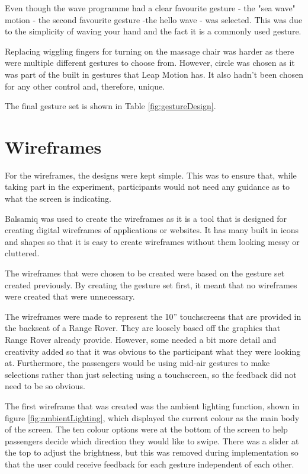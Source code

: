 \documentclass{l4proj}
\begin{document}
Even though the wave programme had a clear favourite gesture - the "sea wave" motion - the second favourite gesture -the hello wave - was selected. This was due to the simplicity of waving your hand and the fact it is a commonly used gesture.

Replacing wiggling fingers for turning on the massage chair was harder as there were multiple different gestures to choose from. However, circle was chosen as it was part of the built in gestures that Leap Motion has. It also hadn't been chosen for any other control and, therefore, unique.

The final gesture set is shown in Table \ref{fig:gestureDesign}.

\section{Wireframes}
For the wireframes, the designs were kept simple. This was to ensure that, while taking part in the experiment, participants would not need any guidance as to what the screen is indicating.

Balsamiq was used to create the wireframes as it is a tool that is designed for creating digital wireframes of applications or websites. It has many built in icons and shapes so that it is easy to create wireframes without them looking messy or cluttered.

The wireframes that were chosen to be created were based on the gesture set created previously. By creating the gesture set first, it meant that no wireframes were created that were unnecessary.

The wireframes were made to represent the 10” touchscreens that are provided in the backseat of a Range Rover. They are loosely based off the graphics that Range Rover already provide. However, some needed a bit more detail and creativity added so that it was obvious to the participant what they were looking at. Furthermore, the passengers would be using mid-air gestures to make selections rather than just selecting using a touchscreen, so the feedback did not need to be so obvious.

The first wireframe that was created was the ambient lighting function, shown in figure \ref{fig:ambientLighting}, which displayed the current colour as the main body of the screen. The ten colour options were at the bottom of the screen to help passengers decide which direction they would like to swipe. There was a slider at the top to adjust the brightness, but this was removed during implementation so that the user could receive feedback for each gesture independent of each other.
\end{document}
